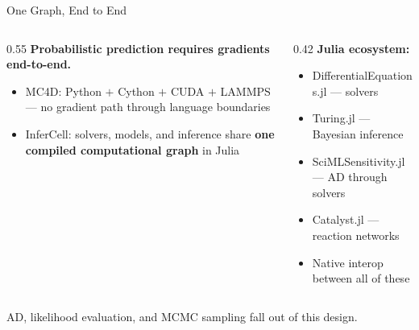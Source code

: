\documentclass[aspectratio=169]{beamer}
\begin{document}
\begin{frame}{One Graph, End to End}
	\begin{columns}[T]
		\begin{column}{0.55\textwidth}
			\textbf{Probabilistic prediction requires gradients end-to-end.}
			\begin{itemize}\itemsep6pt
				\item MC4D: Python $+$ Cython $+$ CUDA $+$ LAMMPS --- no gradient path through language boundaries
				\item InferCell: solvers, models, and inference share \textbf{one compiled computational graph} in Julia
			\end{itemize}
		\end{column}
		\begin{column}{0.42\textwidth}
			\textbf{Julia ecosystem:}
			\begin{itemize}\itemsep5pt
				\item DifferentialEquations.jl --- solvers
				\item Turing.jl --- Bayesian inference
				\item SciMLSensitivity.jl --- AD through solvers
				\item Catalyst.jl --- reaction networks
				\item Native interop between all of these
			\end{itemize}
		\end{column}
	\end{columns}

	\vfill
	\centering
	\alert{AD, likelihood evaluation, and MCMC sampling fall out of this design.}
\end{frame}
\end{document}
